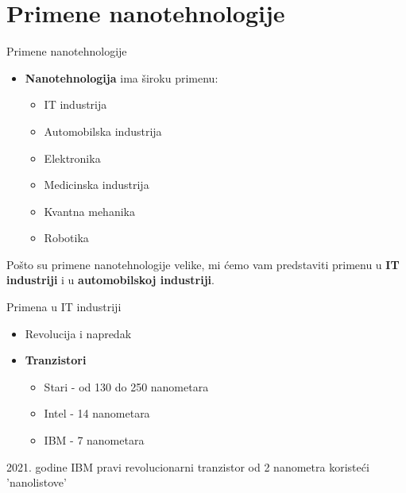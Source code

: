 \documentclass{beamer}
\begin{document}
\section{Primene nanotehnologije}
\begin{frame}{Primene nanotehnologije}
\begin{itemize}
\item \textbf{Nanotehnologija} ima široku primenu:
\begin{itemize}
\item IT industrija
\item Automobilska industrija
\item Elektronika
\item Medicinska industrija
\item Kvantna mehanika
\item Robotika
\end{itemize}
\end{itemize}

Pošto su primene nanotehnologije velike, mi ćemo vam predstaviti primenu u \textbf{IT
industriji} i u \textbf{automobilskoj industriji}.

\end{frame}
\begin{frame}{Primena u IT industriji}
\begin{itemize}
\item Revolucija i napredak
\item \textbf{Tranzistori}
\begin{itemize}
\item Stari - od 130 do 250 nanometara
\item Intel - 14 nanometara
\item IBM - 7 nanometara

\end{itemize}
\end{itemize}

2021. godine IBM pravi revolucionarni tranzistor od 2 nanometra koristeći 'nanolistove'

\end{frame}
\end{document}
